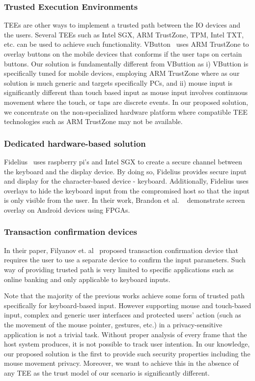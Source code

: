 \subsubsection{Trusted Execution Environments} TEEs are other ways to implement a trusted path between the IO devices and the users. Several TEEs such as Intel SGX, ARM TrustZone, TPM, Intel TXT, etc. can be used to achieve such functionality.  VButton~\cite{li2018vbutton} uses ARM TrustZone to overlay buttons on the mobile devices that conforms if the user taps on certain buttons. Our solution is fundamentally different from VButtion as i) VButtion is specifically tuned for mobile devices, employing ARM TrustZone where as our solution is much generic and targets specifically PCs, and ii) mouse input is significantly different than touch based input as mouse input involves continuous movement where the touch, or taps are discrete events. In our proposed solution, we concentrate on the non-specialized hardware platform where compatible TEE technologies such as ARM TrustZone may not be available. 

\subsubsection{Dedicated hardware-based solution}  Fidelius~\cite{Fidelius} uses raspberry pi's and Intel SGX to create a secure channel between the keyboard and the display device. By doing so, Fidelius provides secure input and display for the character-based device - keyboard. Additionally, Fidelius uses overlays to hide the keyboard input from the compromised host so that the input is only visible from the user. In their work, Brandon et al. ~\cite{brandon2017trusted} demonstrate screen overlay on Android devices using FPGAs.

\subsubsection{Transaction confirmation devices} In their paper, Filyanov et. al~\cite{filyanov2011uni} proposed transaction confirmation device that requires the user to use a separate device to confirm the input parameters. Such way of providing trusted path is very limited to specific applications such as online banking and only applicable to keyboard inputs. 

Note that the majority of the previous works achieve some form of trusted path specifically for keyboard-based input. However supporting mouse and touch-based input, complex and generic user interfaces and protected users' action (such as the movement of the mouse pointer, gestures, etc.) in a privacy-sensitive application is not a trivial task. Without proper analysis of every frame that the host system produces, it is not possible to track user intention. In our knowledge, our proposed solution is the first to provide such security properties including the mouse movement privacy. Moreover, we want to achieve this in the absence of any TEE as the trust model of our scenario is significantly different.


